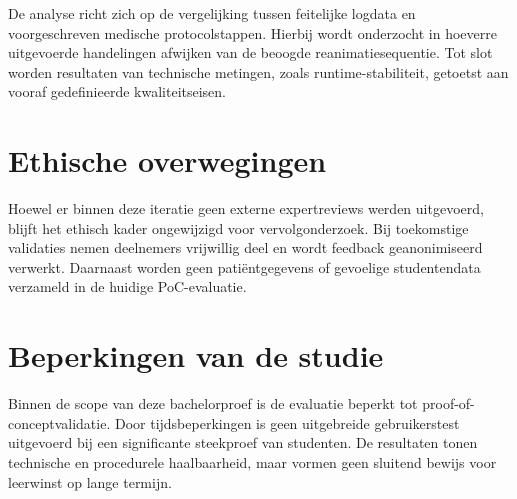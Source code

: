 De analyse richt zich op de vergelijking tussen feitelijke logdata en voorgeschreven medische protocolstappen. Hierbij wordt onderzocht in hoeverre uitgevoerde handelingen afwijken van de beoogde reanimatiesequentie. Tot slot worden resultaten van technische metingen, zoals runtime-stabiliteit, getoetst aan vooraf gedefinieerde kwaliteitseisen.

\section{Ethische overwegingen}

Hoewel er binnen deze iteratie geen externe expertreviews werden uitgevoerd, blijft het ethisch kader ongewijzigd voor vervolgonderzoek. Bij toekomstige validaties nemen deelnemers vrijwillig deel en wordt feedback geanonimiseerd verwerkt. Daarnaast worden geen patiëntgegevens of gevoelige studentendata verzameld in de huidige PoC-evaluatie.

\section{Beperkingen van de studie}

Binnen de scope van deze bachelorproef is de evaluatie beperkt tot proof-of-conceptvalidatie. Door tijdsbeperkingen is geen uitgebreide gebruikerstest uitgevoerd bij een significante steekproef van studenten. De resultaten tonen technische en procedurele haalbaarheid, maar vormen geen sluitend bewijs voor leerwinst op lange termijn.